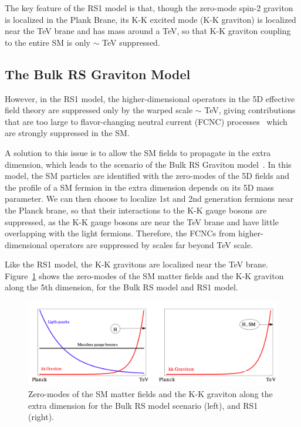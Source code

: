 The key feature of the RS1 model is that, though the zero-mode spin-2 graviton is localized in the Plank Brane, its K-K excited mode (K-K graviton) is localized near the TeV brane and has mass around a TeV, so that K-K graviton coupling to the entire SM is only $\sim$ TeV suppressed.
\subsection{The Bulk RS Graviton Model}
However, in the RS1 model, the higher-dimensional operators in the 5D effective field theory are suppressed only by the warped scale $\sim$ TeV, giving contributions that are too large to flavor-changing neutral current (FCNC) processes~\cite{intro_rsfcnc1,intro_rsfcnc2} which are strongly suppressed in the SM.

\vspace{0.3cm}
A solution to this issue is to allow the SM fields to propagate in the extra dimension, which leads to the scenario of the Bulk RS Graviton model~\cite{intro_bulkref1,intro_bulkref2,intro_bulkref3}. In this model, the SM particles are identified with the zero-modes of the 5D fields and the profile of a SM fermion in the extra dimension depends on its 5D mass parameter. We can then choose to localize 1st and 2nd generation fermions near the Planck brane, so that their interactions to the K-K gauge bosons are suppressed, as the K-K gauge bosons are near the TeV brane and have little overlapping with the light fermions. Therefore,  the FCNCs from higher-dimensional operators are suppressed by scales far beyond TeV scale.

\vspace{0.3cm}
Like the RS1 model, the K-K gravitons are localized near the TeV brane. Figure~\ref{fig:intro_rsandbulk} shows the zero-modes of the SM matter fields and the K-K graviton along the 5th dimension, for the Bulk RS model and RS1 model.
\begin{figure}[htbp]
\begin{center}
\includegraphics[width=0.9\linewidth]{figures/intro_rsandbulk.png}
\caption{Zero-modes of the SM matter fields and the K-K graviton along the extra dimension for the Bulk RS model scenario (left), and RS1 (right).}
\label{fig:intro_rsandbulk}
\end{center}
\end{figure}

